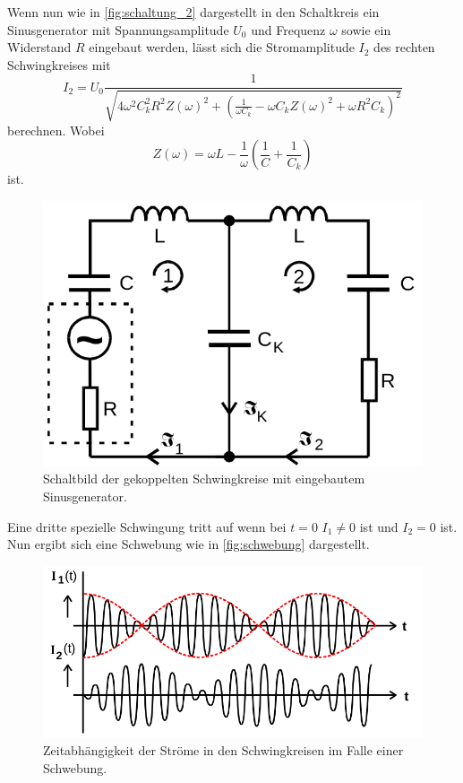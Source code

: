 Wenn nun wie in \autoref{fig:schaltung_2} dargestellt in den Schaltkreis ein Sinusgenerator mit Spannungsamplitude $U_0$ und Frequenz $\omega$ sowie ein Widerstand $R$ eingebaut werden, lässt sich die Stromamplitude $I_2$ des rechten Schwingkreises mit 
\begin{equation}
    \label{eq:stromamplitude}
    I_2 = U_0 \frac{1}{\sqrt{4 \omega^2 C_k^2 R^2 Z(\omega)^2 + \left( \frac{1}{\omega C_k} - \omega C_k Z(\omega)^2 + \omega R^2 C_k \right)^2 }}
\end{equation}
berechnen. Wobei 
\begin{equation}
    Z(\omega) = \omega L - \frac{1}{\omega} \left( \frac{1}{C} + \frac{1}{C_k} \right)
\end{equation}
ist. \cite{V355}
\begin{figure}
    \centering
    \includegraphics[width=\textwidth/3]{images/schaltung_2.png}
    \caption{Schaltbild der gekoppelten Schwingkreise mit eingebautem Sinusgenerator. \cite{V355}}
    \label{fig:schaltung_2}
\end{figure}

Eine dritte spezielle Schwingung tritt auf wenn bei $t=0$ $I_1 \neq 0$ ist und $I_2 = 0$ ist. Nun ergibt sich eine Schwebung wie in \autoref{fig:schwebung} dargestellt.
\begin{figure}
    \centering
    \includegraphics[width=\textwidth/2]{images/schwebung.png}
    \caption{Zeitabhängigkeit der Ströme in den Schwingkreisen im Falle einer Schwebung. \cite{V355}}
    \label{fig:schwebung}
\end{figure}

